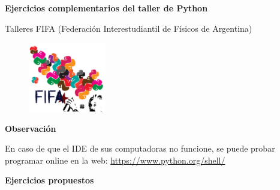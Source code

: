 \documentclass[a4paper]{article}
\begin{document}
\thispagestyle{empty}



\centerline{{\bf\Large{Ejercicios complementarios del taller de Python}}}

\centerline{{\ttfamily Talleres FIFA (Federación Interestudiantil de Físicos de Argentina)}}

\begin{figure}[H]
 \centering
   \includegraphics[width=0.3\textwidth]{logos_python_fifa.png}
 \label{FIFA}
 \end{figure}

\bigskip


\textbf{Observación}

En caso de que el IDE de sus computadoras no funcione, se puede probar programar online en la web: \url{https://www.python.org/shell/}

\bigskip
\centerline{\bf  Ejercicios propuestos}
\bigskip
\end{document}
